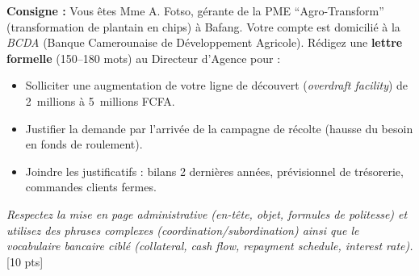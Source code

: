 \documentclass[11pt]{article}
\begin{document}
\begin{exercice}
\textbf{Consigne :} Vous êtes Mme A. Fotso, gérante de la PME ``Agro-Transform'' (transformation de plantain en chips) à Bafang. Votre compte est domicilié à la \textit{BCDA} (Banque Camerounaise de Développement Agricole). Rédigez une \textbf{lettre formelle} (150--180 mots) au Directeur d'Agence pour :
\begin{itemize}
    \item Solliciter une augmentation de votre ligne de découvert (\textit{overdraft facility}) de \SI{2}{millions} à \SI{5}{millions} FCFA.
    \item Justifier la demande par l'arrivée de la campagne de récolte (hausse du besoin en fonds de roulement).
    \item Joindre les justificatifs : bilans 2 dernières années, prévisionnel de trésorerie, commandes clients fermes.
\end{itemize}
\textit{Respectez la mise en page administrative (en-tête, objet, formules de politesse) et utilisez des phrases complexes (coordination/subordination) ainsi que le vocabulaire bancaire ciblé (collateral, cash flow, repayment schedule, interest rate).} [10 pts]
\end{exercice}
\end{document}
